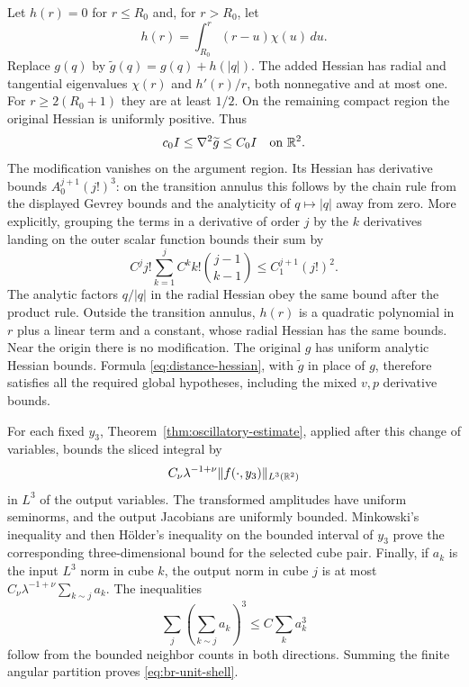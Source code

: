 Let $h(r)=0$ for $r\le R_0$ and, for $r>R_0$, let
\[
 h(r)=\int_{R_0}^r(r-u)\chi(u)\,du.
\]
Replace $g(q)$ by $\widetilde g(q)=g(q)+h(|q|)$.  The added Hessian
has radial and tangential eigenvalues $\chi(r)$ and $h'(r)/r$, both
nonnegative and at most one.  For $r\ge2(R_0+1)$ they are at least
$1/2$.  On the remaining compact region the original Hessian is
uniformly positive.  Thus
\[
 c_0 I\le\nabla^2\widetilde g\le C_0 I\quad\hbox{on }\mathbb R^2.
\]
The modification vanishes on the argument region.  Its Hessian has
derivative bounds $A_0^{j+1}(j!)^3$: on the transition annulus this
follows by the chain rule from the displayed Gevrey bounds and the
analyticity of $q\mapsto|q|$ away from zero.  More explicitly, grouping
the terms in a derivative of order $j$ by the $k$ derivatives landing
on the outer scalar function bounds their sum by
\[
 C^j j!\sum_{k=1}^j C^k k!\binom{j-1}{k-1}
 \le C_1^{j+1}(j!)^2.
\]
The analytic factors $q/|q|$ in the radial Hessian obey the same bound
after the product rule.  Outside the transition annulus,
$h(r)$ is a quadratic polynomial in $r$ plus a linear term and a
constant, whose radial Hessian has the same bounds.  Near the origin
there is no modification.  The original $g$ has uniform analytic
Hessian bounds.  Formula \eqref{eq:distance-hessian}, with
$\widetilde g$ in place of $g$, therefore satisfies all the required
global hypotheses, including the mixed $v,p$ derivative bounds.

For each fixed $y_3$, Theorem~\ref{thm:oscillatory-estimate}, applied
after this change of variables, bounds the sliced integral by
\[
 C_\nu\lambda^{-1+\nu}\|f(\cdot,y_3)\|_{L^3(\mathbb R^2)}
\]
in $L^3$ of the output variables.  The transformed amplitudes have
uniform seminorms, and the output Jacobians are uniformly bounded.
Minkowski's inequality and then H\"older's inequality on the bounded
interval of $y_3$ prove the corresponding three-dimensional bound
for the selected cube pair.  Finally, if $a_k$ is the input $L^3$
norm in cube $k$, the output norm in cube $j$ is at most
$C_\nu\lambda^{-1+\nu}\sum_{k\sim j}a_k$.  The inequalities
\[
 \sum_j\left(\sum_{k\sim j}a_k\right)^3
 \le C\sum_k a_k^3
\]
follow from the bounded neighbor counts in both directions.  Summing
the finite angular partition proves \eqref{eq:br-unit-shell}.

